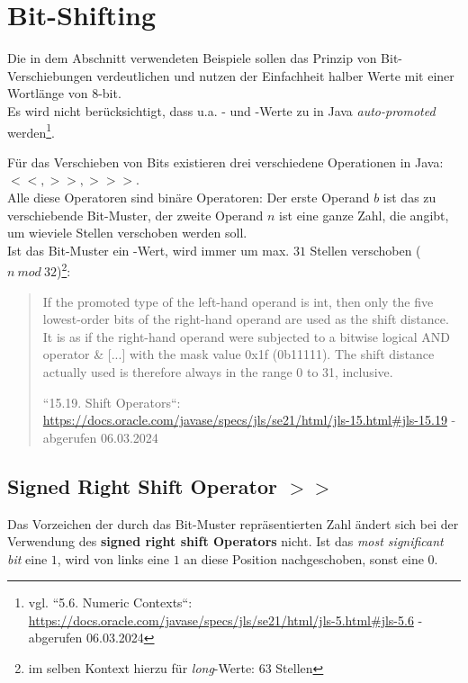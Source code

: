 \section{Bit-Shifting}

\begin{tcolorbox}[colback=red!20,color=white,title={Hinweis}]
    Die in dem Abschnitt verwendeten Beispiele sollen das Prinzip von Bit-Verschiebungen verdeutlichen und nutzen der Einfachheit halber Werte mit einer Wortlänge von 8-bit.\\
    Es wird nicht berücksichtigt, dass u.a. - und -Werte zu  in Java \textit{auto-promoted} werden\footnote{
        vgl. ``5.6. Numeric Contexts``: \url{https://docs.oracle.com/javase/specs/jls/se21/html/jls-5.html#jls-5.6} - abgerufen 06.03.2024
    }.
\end{tcolorbox}

    Für das Verschieben von Bits existieren drei verschiedene Operationen in Java: $<<, >>, >>>$.\\
Alle diese Operatoren sind binäre Operatoren: Der erste Operand $b$ ist das zu verschiebende Bit-Muster, der zweite Operand $n$ ist eine ganze Zahl, die angibt, um wieviele Stellen verschoben werden soll.\\

\noindent
Ist das Bit-Muster ein -Wert, wird immer um max. $31$ Stellen verschoben ($n\ mod\ 32$)\footnote{im selben Kontext hierzu für \textit{long}-Werte: $63$ Stellen}:

\blockquote[{``15.19. Shift Operators``: \url{https://docs.oracle.com/javase/specs/jls/se21/html/jls-15.html#jls-15.19} - abgerufen 06.03.2024}]{
    If the promoted type of the left-hand operand is int, then only the five lowest-order bits of the right-hand operand are used as the shift distance. It is as if the right-hand operand were subjected to a bitwise logical AND operator & [...] with the mask value 0x1f (0b11111). The shift distance actually used is therefore always in the range 0 to 31, inclusive.
}

\subsection{Signed Right Shift Operator $>>$}

\begin{tcolorbox}
Das Vorzeichen der durch das Bit-Muster repräsentierten Zahl ändert sich bei der Verwendung des \textbf{signed right shift Operators} nicht.
Ist das \textit{most significant bit} eine $1$, wird von links eine $1$ an diese Position nachgeschoben, sonst eine $0$.\\
\end{tcolorbox}

